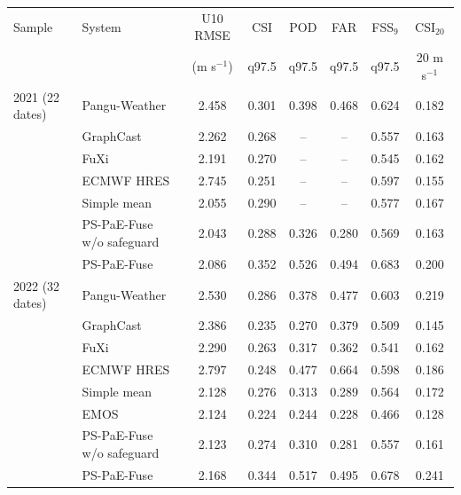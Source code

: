 \begin{tabular}{llcccccc}
\hline
Sample & System & U10 RMSE & CSI & POD & FAR & FSS$_9$ & CSI$_{20}$ \\
 & & (m s$^{-1}$) & q97.5 & q97.5 & q97.5 & q97.5 & 20 m s$^{-1}$ \\
\hline
2021 (22 dates) & Pangu-Weather & 2.458 & 0.301 & 0.398 & 0.468 & 0.624 & 0.182 \\
 & GraphCast & 2.262 & 0.268 & -- & -- & 0.557 & 0.163 \\
 & FuXi & 2.191 & 0.270 & -- & -- & 0.545 & 0.162 \\
 & ECMWF HRES & 2.745 & 0.251 & -- & -- & 0.597 & 0.155 \\
 & Simple mean & 2.055 & 0.290 & -- & -- & 0.577 & 0.167 \\
 & PS-PaE-Fuse w/o safeguard & 2.043 & 0.288 & 0.326 & 0.280 & 0.569 & 0.163 \\
 & PS-PaE-Fuse & 2.086 & 0.352 & 0.526 & 0.494 & 0.683 & 0.200 \\[5pt]
2022 (32 dates) & Pangu-Weather & 2.530 & 0.286 & 0.378 & 0.477 & 0.603 & 0.219 \\
 & GraphCast & 2.386 & 0.235 & 0.270 & 0.379 & 0.509 & 0.145 \\
 & FuXi & 2.290 & 0.263 & 0.317 & 0.362 & 0.541 & 0.162 \\
 & ECMWF HRES & 2.797 & 0.248 & 0.477 & 0.664 & 0.598 & 0.186 \\
 & Simple mean & 2.128 & 0.276 & 0.313 & 0.289 & 0.564 & 0.172 \\
 & EMOS & 2.124 & 0.224 & 0.244 & 0.228 & 0.466 & 0.128 \\
 & PS-PaE-Fuse w/o safeguard & 2.123 & 0.274 & 0.310 & 0.281 & 0.557 & 0.161 \\
 & PS-PaE-Fuse & 2.168 & 0.344 & 0.517 & 0.495 & 0.678 & 0.241 \\
\hline
\end{tabular}
